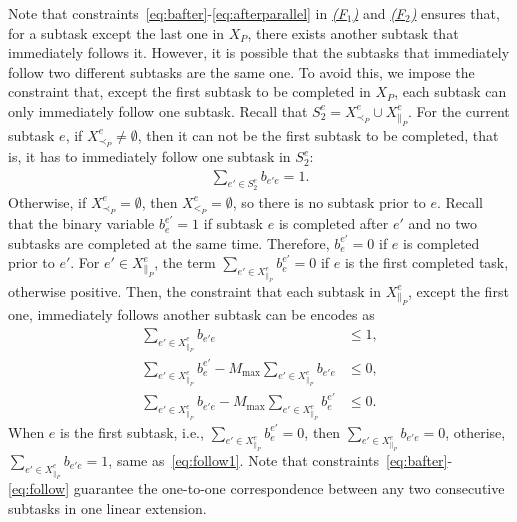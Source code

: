 \documentclass[Afour,sageh,times]{sagej}
\begin{document}
{{{Note that constraints~\eqref{eq:bafter}-\eqref{eq:afterparallel} in \hyperref[activation:a]{\it (F$_1$)} and \hyperref[activation:b]{\it (F$_2$)} ensures that, for a subtask except the last one in $X_P$, there exists another subtask that immediately follows it. However, it is possible that the subtasks that immediately follow two different subtasks are the same one. To avoid this, we impose the constraint that, except the first subtask   to be completed in $X_P$, each subtask  can only immediately follow one subtask. Recall that $S_2^e = X^e_{\prec_{P}} \cup X^e_{\|_{P}}$.  For the current subtask $e$, if  $X^e_{\prec_{P}} \neq \emptyset$, then it can not be the first subtask to be completed, that is, it has to immediately follow one subtask in $S_2^e$:
\begingroup\makeatletter\def\f@size{10}\check@mathfonts
\def\maketag@@@#1{\hbox{\m@th\normalsize\normalfont#1}}%
  \begin{align}\label{eq:follow1}
 \sum_{e' \in S_2^e} b_{e'e} = 1.
\end{align}
  \endgroup
Otherwise, if $X^e_{\prec_{P}} = \emptyset$, then  $X^e_{<_{P}} = \emptyset$,  so there is no subtask prior to $e$. Recall that the binary variable $b_e^{e'}=1$ if subtask $e$ is completed after $e'$ and no two subtasks are completed at the same time. Therefore, $b_e^{e'}=0$ if $e$ is completed prior to $e'$. For $e' \in  X_{\|_P}^e$, the term $\sum_{e' \in X_{\|_P}^e } {b}_{e}^{e'}=0$ if $e$ is the first completed task, otherwise  positive. Then, the constraint that each subtask in $X_{\|_P}^e$, except the first one,  immediately follows another subtask can be encodes as
\begingroup\makeatletter\def\f@size{10}\check@mathfonts
\def\maketag@@@#1{\hbox{\m@th\normalsize\normalfont#1}}%
\begin{subequations}\label{eq:follow}
  \begin{align}
  \sum_{e' \in X_{\|_P}^e} b_{e'e} & \le 1,\label{eq:follow_a}\\
 \sum_{e' \in X^e_{\|_{P}}  } b_{e}^{e'} - M_{\text{max}}  \sum_{e' \in X_{\|_P}^e} b_{e'e} &  \leq 0, \label{eq:follow_b} \\
  \sum_{e' \in X_{\|_P}^e} b_{e'e} - M_{\text{max}} \sum_{e' \in X^e_{\|_{P}}  } b_{e}^{e'} & \leq0 . \label{eq:follow_c}
\end{align}
\end{subequations}
\endgroup
When $e$ is the first subtask, i.e., $\sum_{e' \in X^e_{\|_{P}}  } b_{e}^{e'}=0$, then $\sum_{e' \in X_{\|_P}^e} b_{e'e} = 0$, otherise, $\sum_{e' \in X_{\|_P}^e} b_{e'e} = 1$, same as~\eqref{eq:follow1}. Note that constraints~\eqref{eq:bafter}-\eqref{eq:follow} guarantee the one-to-one correspondence between any two consecutive subtasks in one linear extension.


}}}
\end{document}
